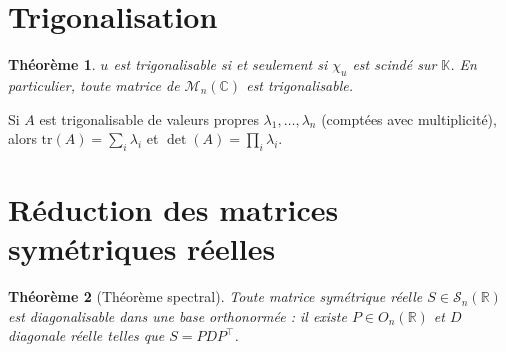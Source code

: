 \documentclass{article}
\newtheorem{theoreme}{Théorème}
\begin{document}
\section{Trigonalisation}

\begin{theoreme}
$u$ est trigonalisable si et seulement si $\chi_u$ est scindé sur $\mathbb{K}$.
En particulier, toute matrice de $\mathcal{M}_n(\mathbb{C})$ est trigonalisable.
\end{theoreme}

Si $A$ est trigonalisable de valeurs propres $\lambda_1, \dots, \lambda_n$ (comptées avec
multiplicité), alors $\mathrm{tr}(A) = \sum_i \lambda_i$ et $\det(A) = \prod_i \lambda_i$.

\section{Réduction des matrices symétriques réelles}

\begin{theoreme}[Théorème spectral]
Toute matrice symétrique réelle $S \in \mathcal{S}_n(\mathbb{R})$ est diagonalisable dans une
base orthonormée : il existe $P \in O_n(\mathbb{R})$ et $D$ diagonale réelle telles que
$S = P D P^{\top}$.
\end{theoreme}
\end{document}
